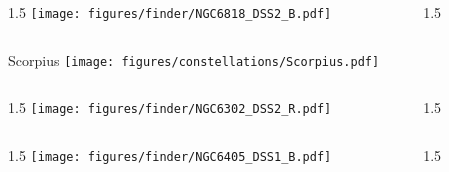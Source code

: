 \documentclass[final]{beamer}
\newlength{\colwidth}
\begin{document}

\begin{frame}[t]{}
    \begin{columns}[T]
        \begin{column}{1.5\colwidth}
            \centering
            \texttt{[image: figures/finder/NGC6818\_DSS2\_B.pdf]}
        \end{column}
        \begin{column}{1.5\colwidth}
            \Large
            
        \end{column}
    \end{columns}
    \vspace{\fill}
\end{frame}


\begin{frame}[t]{\LARGE Scorpius}
    \centering
    \texttt{[image: figures/constellations/Scorpius.pdf]}
\end{frame}


\begin{frame}[t]{}
    \begin{columns}[T]
        \begin{column}{1.5\colwidth}
            \centering
            \texttt{[image: figures/finder/NGC6302\_DSS2\_R.pdf]}
        \end{column}
        \begin{column}{1.5\colwidth}
            \Large
            
        \end{column}
    \end{columns}
    \vspace{\fill}
    \begin{columns}[T]
        \begin{column}{1.5\colwidth}
            \centering
            \texttt{[image: figures/finder/NGC6405\_DSS1\_B.pdf]}
        \end{column}
        \begin{column}{1.5\colwidth}
            \Large
            
        \end{column}
    \end{columns}
\end{frame}
\end{document}
